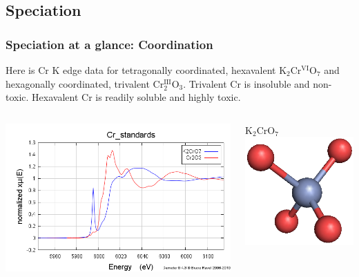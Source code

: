 \documentclass[10pt, xcolor=x11names, compress]{beamer}
\begin{document}
\subsection{Speciation}
\begin{frame}
  \frametitle{Speciation at a glance: Coordination}

  Here is Cr K edge data for {\color{Blue3}tetragonally coordinated,
    hexavalent K$_2$Cr$^{\textrm{VI}}$O$_7$} and
  {\color{Red2}hexagonally coordinated, trivalent
    Cr$^{\textrm{III}}_2$O$_3$}.  Trivalent Cr is insoluble and
  non-toxic.  Hexavalent Cr is readily soluble and highly toxic.

  \begin{columns}
    \begin{column}{0.7\linewidth}
      \begin{center}
        \includegraphics[width=0.9\linewidth]{images/Cr/Cr.png}
      \end{center}
    \end{column}
    \begin{column}{0.3\linewidth}
      \begin{center}
        {\color{Blue3}K$_2$CrO$_7$}\\
        \includegraphics[width=0.5\linewidth]{images/Cr/K2CrO7.png}\\[2ex]

\end{center}
\end{column}
\end{columns}
\end{frame}
\end{document}
